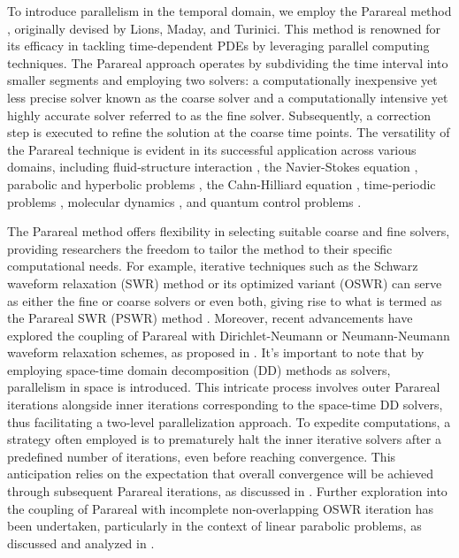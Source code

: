 \documentclass[11pt]{article}
\begin{document}
To introduce parallelism in the temporal domain, we employ the Parareal method \cite{lions2001parareal}, originally devised by Lions, Maday, and Turinici. This method is renowned for its efficacy in tackling time-dependent PDEs by leveraging parallel computing techniques. The Parareal approach operates by subdividing the time interval into smaller segments and employing two solvers: a computationally inexpensive yet less precise solver known as the coarse solver and a computationally intensive yet highly accurate solver referred to as the fine solver. Subsequently, a correction step is executed to refine the solution at the coarse time points. The versatility of the Parareal technique is evident in its successful application across various domains, including fluid-structure interaction \cite{farhat2003time}, the Navier-Stokes equation \cite{fischer2005parareal}, parabolic and hyperbolic problems \cite{gander2007analysis}, the Cahn-Hilliard equation \cite{garai2024convergence}, time-periodic problems \cite{gander2013analysis}, molecular dynamics \cite{baffico2002parallel}, and quantum control problems \cite{maday2007monotonic, maday2002parareal, maday2003parallel}.
 
 
The Parareal method offers flexibility in selecting suitable coarse and fine solvers, providing researchers the freedom to tailor the method to their specific computational needs. For example, iterative techniques such as the Schwarz waveform relaxation (SWR) method \cite{gander1998space} or its optimized variant (OSWR) \cite{gander2007optimized} can serve as either the fine or coarse solvers or even both, giving rise to what is termed as the Parareal SWR (PSWR) method \cite{gander2019superlinear}. Moreover, recent advancements have explored the coupling of Parareal with Dirichlet-Neumann or Neumann-Neumann waveform relaxation schemes, as proposed in \cite{song2021analysis}.
It's important to note that by employing space-time domain decomposition (DD) methods as solvers, parallelism in space is introduced. This intricate process involves outer Parareal iterations alongside inner iterations corresponding to the space-time DD solvers, thus facilitating a two-level parallelization approach. To expedite computations, a strategy often employed is to prematurely halt the inner iterative solvers after a predefined number of iterations, even before reaching convergence. This anticipation relies on the expectation that overall convergence will be achieved through subsequent Parareal iterations, as discussed in \cite{maday2005parareal}.
Further exploration into the coupling of Parareal with incomplete non-overlapping OSWR iteration has been undertaken, particularly in the context of linear parabolic problems, as discussed and analyzed in \cite{bui2022coupling}. 
\end{document}
